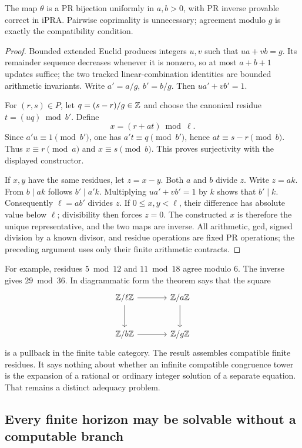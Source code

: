 \begin{theorem}
\label{thm:crt}
The map $\theta$ is a PR bijection uniformly in $a,b>0$, with PR inverse
provable correct in iPRA. Pairwise coprimality is unnecessary; agreement
modulo $g$ is exactly the compatibility condition.
\end{theorem}

\begin{proof}
Bounded extended Euclid produces integers $u,v$ such that
$ua+vb=g$. Its remainder sequence decreases whenever it is nonzero, so at
most $a+b+1$ updates suffice; the two tracked linear-combination identities
are bounded arithmetic invariants. Write $a'=a/g$, $b'=b/g$.
Then $ua'+vb'=1$.

For $(r,s)\in P$, let $q=(s-r)/g\in\mathbb Z$ and choose the canonical residue
$t=(uq)\bmod b'$. Define
\[
 x=(r+at)\bmod\ell.
\]
Since $a'u\equiv1\pmod {b'}$, one has
$a't\equiv q\pmod {b'}$, hence $at\equiv s-r\pmod b$.
Thus $x\equiv r\pmod a$ and $x\equiv s\pmod b$.
This proves surjectivity with the displayed constructor.

If $x,y$ have the same residues, let $z=x-y$. Both $a$ and $b$ divide $z$.
Write $z=ak$. From $b\mid ak$ follows $b'\mid a'k$.
Multiplying $ua'+vb'=1$ by $k$ shows that $b'\mid k$.
Consequently $\ell=ab'$ divides $z$. If $0\le x,y<\ell$, their
difference has absolute value below $\ell$; divisibility then forces $z=0$.
The constructed $x$ is therefore the unique representative, and the two
maps are inverse. All arithmetic, gcd, signed division by a known divisor,
and residue operations are fixed PR operations; the preceding argument uses
only their finite arithmetic contracts.
\end{proof}

For example, residues $5\bmod12$ and $11\bmod18$ agree modulo $6$.
The inverse gives $29\bmod36$. In diagrammatic form the theorem says that
the square
\[
\begin{tikzcd}[column sep=large,row sep=large]
 \Z/\ell\Z \arrow[r] \arrow[d] & \Z/a\Z \arrow[d] \\
 \Z/b\Z \arrow[r] & \Z/g\Z
\end{tikzcd}
\]
is a pullback in the finite table category. The result assembles compatible
finite residues. It says nothing about whether an infinite compatible
congruence tower is the expansion of a rational or ordinary integer solution
of a separate equation. That remains a distinct adequacy problem.

\subsection{Every finite horizon may be solvable without a computable branch}

